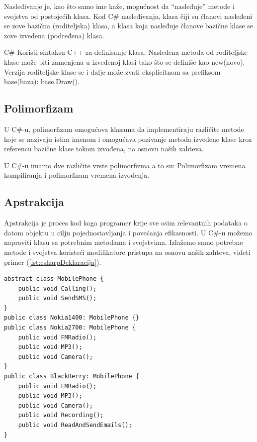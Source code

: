 \documentclass[a4paper]{article}
\begin{document}
{Nasleđivanje je, kao što samo ime kaže, mogućnost da “nasleđuje” metode i svojstva od postojećih klasa.
Kod C\# nasleđivanja, klasa čiji su članovi nasleđeni se zove bazična (roditeljska) klasa, a klasa koja nasleđuje članove bazične klase se zove izvedena (podređena) klasa.

C\# Koristi sintaksu C++ za definisanje klasa.
Nasleđena metoda od roditeljske klase može biti zamenjena u izvedenoj klasi tako što se definiše kao new(novo).
Verzija roditeljske klase se i dalje može zvati eksplicitnom sa prefiksom base(baza): base.Draw().

\subsection{Polimorfizam}
\label{subsec:csharpPolimorfizam}

U C\#-u, polimorfizam omogućava klasama da implementiraju različite metode koje se nazivaju istim imenom i omogućava pozivanje metoda izvedene klase kroz referencu bazične klase tokom izvođena, na osnovu naših zahteva.

U C\#-u imamo dve različite vrste polimorfizma a to su: Polimorfizam vremena kompiliranja i polimorfizam vremena izvođenja.

\subsection{Apstrakcija}
\label{subsec:csharpApstrakcija}

Apstrakcija je proces kod koga programer krije sve osim relevantnih podataka o datom objektu u cilju pojednostavljanja i povećanja efikasnosti.
U C\#-u možemo napraviti klasu sa potrebnim metodama i svojstvima. Izlažemo samo potrebne metode i svojstva koristeći modifikatore pristupa na osnovu naših zahteva, videti primer (\ref{lst:csharpDeklaracija}).

\begin{lstlisting}[caption={Primer deklarisanja apstraktivne klase u C\#-u},frame=single, label=lst:csharpDeklaracija]
abstract class MobilePhone {  
    public void Calling();  
    public void SendSMS();  
}  
public class Nokia1400: MobilePhone {}  
public class Nokia2700: MobilePhone {  
    public void FMRadio();  
    public void MP3();  
    public void Camera();  
}  
public class BlackBerry: MobilePhone {  
    public void FMRadio();  
    public void MP3();  
    public void Camera();  
    public void Recording();  
    public void ReadAndSendEmails();  
} 
\end{lstlisting}

}
\end{document}

